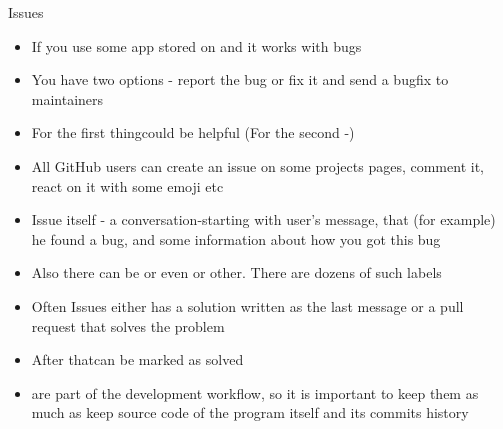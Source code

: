 \documentclass[usenames,dvipsnames,10pt,aspectratio=169]{beamer}
\begin{document}
\begin{frame}{Issues}
    \begin{itemize}
        \item If you use some app stored on  and it works with bugs
        \item You have two options - report the bug or fix it and send a bugfix to maintainers
        \item For the first thingcould be helpful (For the second -)
        \item All GitHub users can create an issue on some projects pages, comment it, react on it with some emoji etc
        \item Issue itself - a conversation-starting with user's message, that (for example) he found a bug, and some information about how you got this bug
        \item Also there can be  or even  or other. There are dozens of such labels
        \item Often Issues either has a solution written as the last message or a pull request that solves the problem
        \item After thatcan be marked as solved
        \item {} are part of the development workflow, so it is important to keep them as much as keep source code of the program itself and its commits history
    \end{itemize}
\end{frame}

\end{document}
